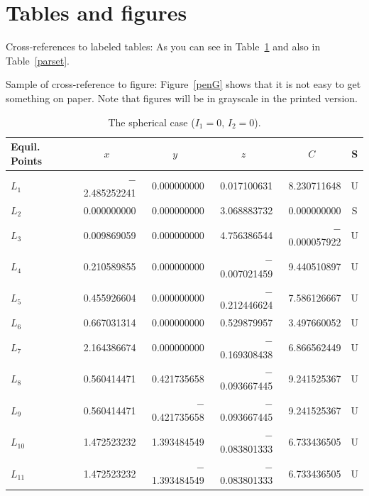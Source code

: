 \documentclass[qe,nameyear,draft]{econsocart}
\theoremstyle{plain}
\theoremstyle{remark}
\begin{document}
\section{Tables and figures}
Cross-references to labeled tables: As you can see in Table~\ref{sphericcase}
and also in Table~\ref{parset}.

Sample of cross-reference to figure: Figure~\ref{penG} shows that it is not easy to get something on paper. Note that figures will be in grayscale in the printed version.

\begin{table}
\caption{The spherical case ($I_1=0$, $I_2=0$).}
\label{sphericcase}
\begin{tabular}{@{}lrrrrc@{}@{}}
\hline
Equil. Points
& \multicolumn{1}{c}{$x$}
& \multicolumn{1}{c}{$y$}
& \multicolumn{1}{c}{$z$}
& \multicolumn{1}{c}{$C$}
& S \\
\hline
$L_1$    & $-$2.485252241 & 0.000000000    & 0.017100631    & 8.230711648    & U \\
$L_2$    & 0.000000000    & 0.000000000    & 3.068883732    & 0.000000000    & S \\
$L_3$    & 0.009869059    & 0.000000000    & 4.756386544    & $-$0.000057922 & U \\
$L_4$    & 0.210589855    & 0.000000000    & $-$0.007021459 & 9.440510897    & U \\
$L_5$    & 0.455926604    & 0.000000000    & $-$0.212446624 & 7.586126667    & U \\
$L_6$    & 0.667031314    & 0.000000000    & 0.529879957    & 3.497660052    & U \\
$L_7$    & 2.164386674    & 0.000000000    & $-$0.169308438 & 6.866562449    & U \\
$L_8$    & 0.560414471    & 0.421735658    & $-$0.093667445 & 9.241525367    & U \\
$L_9$    & 0.560414471    & $-$0.421735658 & $-$0.093667445 & 9.241525367    & U \\
$L_{10}$ & 1.472523232    & 1.393484549    & $-$0.083801333 & 6.733436505    & U \\
$L_{11}$ & 1.472523232    & $-$1.393484549 & $-$0.083801333 & 6.733436505    & U \\
\hline
\end{tabular}

\end{table}
\end{document}
